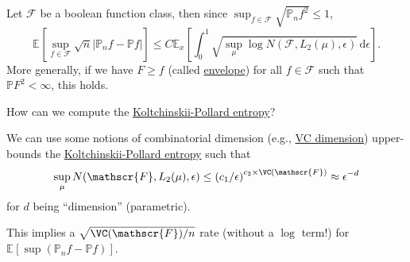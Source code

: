 \begin{intuition}\label{int:main-bound}
	Let \(\mathscr{F} \) be a boolean function class, then since \(\sup _{f\in\mathscr{F} } \sqrt{\mathbb{P} _n f^2} \leq 1\),
	\[
		\mathbb{E}_{}\left[\sup _{f\in \mathscr{F} } \sqrt{n} \vert \mathbb{P} _n f - \mathbb{P} f \vert  \right]
		\leq C \mathbb{E}_{x}\left[ \int_{0}^{1} \sqrt{\sup _\mu \log N(\mathscr{F} , L_2(\mu ), \epsilon )}  \,\mathrm{d}\epsilon \right].
	\]
	More generally, if we have \(F \geq f\) (called \hyperref[def:envelope]{envelope}) for all \(f\in \mathscr{F} \) such that \(\mathbb{P} F^2 < \infty \), this holds.
\end{intuition}

\begin{problem*}\label{prb:lec13}
	How can we compute the \hyperref[def:Koltchinskii-Pollard-entropy]{Koltchinskii-Pollard entropy}?
\end{problem*}
\begin{answer}
	We can use some notions of combinatorial dimension (e.g., \hyperref[def:VC-dimension]{VC dimension}) upper-bounds the \hyperref[def:Koltchinskii-Pollard-entropy]{Koltchinskii-Pollard entropy} such that
	\[
		\sup _\mu N(\mathscr{F} , L_2(\mu ), \epsilon )
		\leq \left( c_1 / \epsilon \right) ^{c_2 \times \VC(\mathscr{F} )}
		\approx \epsilon ^{-d}
	\]
	for \(d\) being ``dimension'' (parametric).
\end{answer}

\begin{remark}
	This implies a \(\sqrt{\VC(\mathscr{F} ) / n} \) rate (without a \(\log \) term!) for \(\mathbb{E}_{}\left[\sup (\mathbb{P} _n f - \mathbb{P} f) \right] \).
\end{remark}